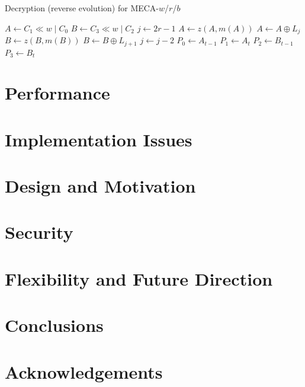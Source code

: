 \documentclass{article}
\begin{document}
\begin{algorithm}[H]
  \begin{algorithmic}
    \caption{Decryption (reverse evolution) for MECA-$w$/$r$/$b$}\label{alg:decryption}
    \Input
    \EndInput
    \Output
    \EndOutput
    \State $A \gets C_1 \ll w \mathbin{|}  C_0$
	\State $B \gets C_3 \ll w \mathbin{|}  C_2$
	\State $j \gets 2r-1$
		\State $A \gets z(A, m(A))$
		\State $A \gets A \oplus L_j$
		\State $B \gets z(B, m(B))$
		\State $B \gets B \oplus L_{j+1}$
		\State $j \gets j - 2$
    \EndFor
    \State $P_0 \gets A_{t-1}$
    \State $P_1 \gets A_{t}$
    \State $P_2 \gets B_{t-1}$
    \State $P_3 \gets B_{t}$
  \end{algorithmic}
\end{algorithm}

\section{Performance}

\section{Implementation Issues}

\section{Design and Motivation}

\section{Security}

\section{Flexibility and Future Direction}

\section{Conclusions}

\section{Acknowledgements}
\end{document}
